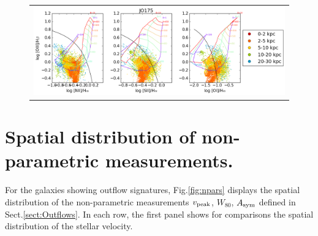 \documentclass[fleqn,usenatbib]{mnras}
\begin{document}
\begin{figure}
	\begin{tabular}{c}%
\includegraphics[width=.8\linewidth]{Plots/JO175_vo_dist_SH_n1_R_tot.png}\\
\end{tabular} 
\contcaption{}
\end{figure}






\section{Spatial distribution of non-parametric measurements.}
\label{app:map_nonparam}

For the galaxies showing outflow signatures, 
Fig.\ref{fig:npars} displays the spatial distribution of the non-parametric measurements $v_{\rm peak}$, $W_{80}$,  $A_{\rm sym}$ defined in Sect.\ref{sect:Outflows}. In each row, the first panel shows for comparisons the spatial distribution of the stellar velocity.
\end{document}
